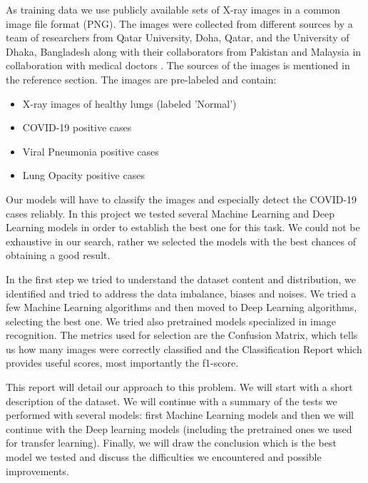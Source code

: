 \documentclass{article}
\begin{document}
As training data we use publicly available sets of X-ray images in a common image file format (PNG). The images were collected from different sources by a team of researchers from Qatar University, Doha, Qatar, and the University of Dhaka, Bangladesh along with their collaborators from Pakistan and Malaysia in collaboration with medical doctors \cite{chowdhury2020} \cite{rahman2020}. The sources of the images is mentioned in the reference section. The images are pre-labeled and contain:
\begin{itemize}
    \item X-ray images of healthy lungs (labeled 'Normal')
    \item COVID-19 positive cases
    \item  Viral Pneumonia positive cases
    \item  Lung Opacity positive cases
\end{itemize}
 
Our models will have to classify the images and especially detect the COVID-19 cases reliably. In this project we tested several Machine Learning and Deep Learning models in order to establish the best one for this task. We could not be exhaustive in our search, rather we selected the models with the best chances of obtaining a good result.

In the first step we tried to understand the dataset content and distribution, we identified and tried to address the data imbalance, biases and noises. We tried a few Machine Learning algorithms and then moved to Deep Learning algorithms, selecting the best one. We tried also pretrained models specialized in image recognition. The metrics used for selection are the Confusion Matrix, which tells us how many images were correctly classified and the Classification Report which provides useful scores, most importantly the f1-score.

This report will detail our approach to this problem. We will start with a short description of the dataset. We will continue with a summary of the tests we performed with several models: first Machine Learning models and then we will continue with the Deep learning models (including the pretrained ones we used for transfer learning). Finally, we will draw the conclusion which is the best model we tested and discuss the difficulties we encountered and possible improvements.  

\newpage

\end{document}
